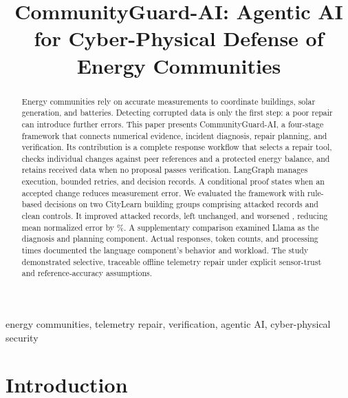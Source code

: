 \documentclass[conference]{IEEEtran}
\begin{document}
\title{CommunityGuard-AI: Agentic AI for Cyber-Physical Defense of Energy Communities}

\author{
}
\maketitle


\begin{abstract}

Energy communities rely on accurate measurements to coordinate buildings, solar generation, and batteries. Detecting corrupted data is only the first step: a poor repair can introduce further errors. This paper presents CommunityGuard-AI, a four-stage framework that connects numerical evidence, incident diagnosis, repair planning, and verification. Its contribution is a complete response workflow that selects a repair tool, checks individual changes against peer references and a protected energy balance, and retains received data when no proposal passes verification. LangGraph manages execution, bounded retries, and decision records. A conditional proof states when an accepted change reduces measurement error. We evaluated the framework with rule-based decisions on two CityLearn building groups comprising \CaseN{} attacked records and \CleanN{} clean controls. It improved \ImproveN{} attacked records, left \UnchangedN{} unchanged, and worsened \HarmN{}, reducing mean normalized error by \ErrorReduction{}\%. \CleanAbstract{} A supplementary comparison examined Llama as the diagnosis and planning component. \PairedAbstract{} Actual responses, token counts, and processing times documented the language component's behavior and workload. The study demonstrated selective, traceable offline telemetry repair under explicit sensor-trust and reference-accuracy assumptions.

\end{abstract}

\begin{IEEEkeywords}
energy communities, telemetry repair, verification, agentic AI, cyber-physical security
\end{IEEEkeywords}
\section{Introduction}
\end{document}
